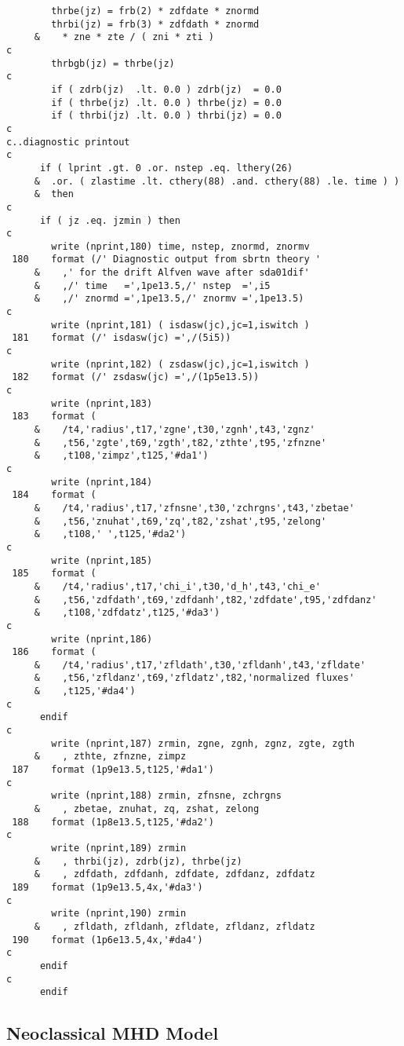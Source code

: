 \begin{verbatim}
        thrbe(jz) = frb(2) * zdfdate * znormd
        thrbi(jz) = frb(3) * zdfdath * znormd
     &    * zne * zte / ( zni * zti )
c
        thrbgb(jz) = thrbe(jz)
c
        if ( zdrb(jz)  .lt. 0.0 ) zdrb(jz)  = 0.0
        if ( thrbe(jz) .lt. 0.0 ) thrbe(jz) = 0.0
        if ( thrbi(jz) .lt. 0.0 ) thrbi(jz) = 0.0
c
c..diagnostic printout
c
      if ( lprint .gt. 0 .or. nstep .eq. lthery(26)
     &  .or. ( zlastime .lt. cthery(88) .and. cthery(88) .le. time ) )
     &  then
c
      if ( jz .eq. jzmin ) then
c
        write (nprint,180) time, nstep, znormd, znormv
 180    format (/' Diagnostic output from sbrtn theory '
     &    ,' for the drift Alfven wave after sda01dif'
     &    ,/' time   =',1pe13.5,/' nstep  =',i5
     &    ,/' znormd =',1pe13.5,/' znormv =',1pe13.5)
c
        write (nprint,181) ( isdasw(jc),jc=1,iswitch )
 181    format (/' isdasw(jc) =',/(5i5))
c
        write (nprint,182) ( zsdasw(jc),jc=1,iswitch )
 182    format (/' zsdasw(jc) =',/(1p5e13.5))
c
        write (nprint,183)
 183    format (
     &    /t4,'radius',t17,'zgne',t30,'zgnh',t43,'zgnz'
     &    ,t56,'zgte',t69,'zgth',t82,'zthte',t95,'zfnzne'
     &    ,t108,'zimpz',t125,'#da1')
c
        write (nprint,184)
 184    format (
     &    /t4,'radius',t17,'zfnsne',t30,'zchrgns',t43,'zbetae'
     &    ,t56,'znuhat',t69,'zq',t82,'zshat',t95,'zelong'
     &    ,t108,' ',t125,'#da2')
c
        write (nprint,185)
 185    format (
     &    /t4,'radius',t17,'chi_i',t30,'d_h',t43,'chi_e'
     &    ,t56,'zdfdath',t69,'zdfdanh',t82,'zdfdate',t95,'zdfdanz'
     &    ,t108,'zdfdatz',t125,'#da3')
c
        write (nprint,186)
 186    format (
     &    /t4,'radius',t17,'zfldath',t30,'zfldanh',t43,'zfldate'
     &    ,t56,'zfldanz',t69,'zfldatz',t82,'normalized fluxes'
     &    ,t125,'#da4')
c
      endif
c
        write (nprint,187) zrmin, zgne, zgnh, zgnz, zgte, zgth
     &    , zthte, zfnzne, zimpz
 187    format (1p9e13.5,t125,'#da1')
c
        write (nprint,188) zrmin, zfnsne, zchrgns
     &    , zbetae, znuhat, zq, zshat, zelong
 188    format (1p8e13.5,t125,'#da2')
c
        write (nprint,189) zrmin
     &    , thrbi(jz), zdrb(jz), thrbe(jz)
     &    , zdfdath, zdfdanh, zdfdate, zdfdanz, zdfdatz
 189    format (1p9e13.5,4x,'#da3')
c
        write (nprint,190) zrmin
     &    , zfldath, zfldanh, zfldate, zfldanz, zfldatz
 190    format (1p6e13.5,4x,'#da4')
c
      endif
c
      endif
\end{verbatim}

\subsection{Neoclassical MHD Model}

